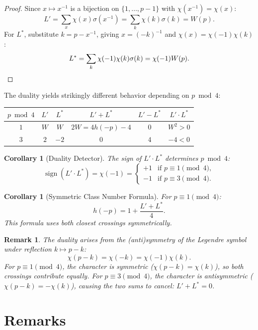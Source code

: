 \documentclass[11pt,a4paper]{article}
\newtheorem{corollary}[theorem]{Corollary}
\newtheorem{remark}{Remark}
\begin{document}
\begin{proof}
Since $x \mapsto x^{-1}$ is a bijection on $\{1, \ldots, p-1\}$ with $\chi(x^{-1}) = \chi(x)$:
\[
L' = \sum_x \chi(x) \sigma(x^{-1}) = \sum_k \chi(k) \sigma(k) = W(p).
\]
For $L^*$, substitute $k = p - x^{-1}$, giving $x = (-k)^{-1}$ and $\chi(x) = \chi(-1)\chi(k)$:
\[
L^* = \sum_k \chi(-1)\chi(k) \sigma(k) = \chi(-1) W(p). \qedhere
\]
\end{proof}

The duality yields strikingly different behavior depending on $p \bmod 4$:

\begin{center}
\begin{tabular}{c|cc|ccc}
$p \bmod 4$ & $L'$ & $L^*$ & $L' + L^*$ & $L' - L^*$ & $L' \cdot L^*$ \\
\hline
$1$ & $W$ & $W$ & $2W = 4h(-p) - 4$ & $0$ & $W^2 > 0$ \\
$3$ & $2$ & $-2$ & $0$ & $4$ & $-4 < 0$
\end{tabular}
\end{center}

\begin{corollary}[Duality Detector]\label{cor:detector}
The sign of $L' \cdot L^*$ determines $p \bmod 4$:
\[
\operatorname{sign}(L' \cdot L^*) = \chi(-1) = \begin{cases} +1 & \text{if } p \equiv 1 \pmod 4, \\ -1 & \text{if } p \equiv 3 \pmod 4. \end{cases}
\]
\end{corollary}

\begin{corollary}[Symmetric Class Number Formula]\label{cor:symmetric}
For $p \equiv 1 \pmod 4$:
\[
h(-p) = 1 + \frac{L' + L^*}{4}.
\]
This formula uses \emph{both} closest crossings symmetrically.
\end{corollary}

\begin{remark}
The duality arises from the (anti)symmetry of the Legendre symbol under reflection $k \mapsto p - k$:
\[
\chi(p - k) = \chi(-k) = \chi(-1) \chi(k).
\]
For $p \equiv 1 \pmod 4$, the character is symmetric ($\chi(p-k) = \chi(k)$), so both crossings contribute equally. For $p \equiv 3 \pmod 4$, the character is antisymmetric ($\chi(p-k) = -\chi(k)$), causing the two sums to cancel: $L' + L^* = 0$.
\end{remark}

\section{Remarks}
\end{document}
